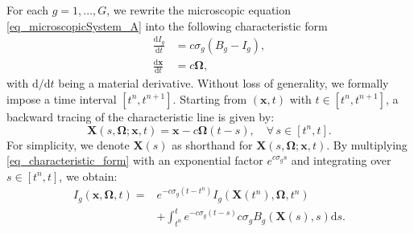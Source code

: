 \documentclass[preprint,12pt]{elsarticle}
\theoremstyle{definition}
\theoremstyle{plain}
\numberwithin{equation}{section}
\numberwithin{algorithm}{section}
\newcounter{eq_count}
\newcounter{subeq_count}
\newcounter{tab_count}
\newcommand{\vOmega}{\mathbf{\Omega}}
\newcommand{\vx}{\mathbf{x}}
\newcommand{\mfx}{{\mathbf{X}}}
\newcommand{\dd}{{\text{d}}}
\begin{document}





For each $g=1,\ldots,G$, we rewrite the microscopic equation \eqref{eq_microscopicSystem_A} into the following characteristic form
    \begin{subequations}
        \begin{align}\label{eq_characteristic_form}
            \frac{\dd{I_g}}{\dd{t}} &= c \sigma_g ( B_g - I_g),
            \\
            \frac{\dd{\vx}}{\dd{t}} &= c \vOmega,
        \end{align}
    \end{subequations}
with $\dd{} / \dd{t} $ being a material derivative.  
Without loss of generality, we formally impose a time interval $[t^n,t^{n+1}]$.
 Starting from $(\vx,t)$ with $t \in [t^n,t^{n+1}]$, a backward tracing of the characteristic line is given by:
    \begin{equation}\label{eq_def_characteristic_line}
        \mfx(s,\vOmega;\vx,t)=\vx-c \vOmega (t-s), \quad \forall \, s \in [t^n,t].
    \end{equation}
For simplicity, we denote $\mfx(s)$ as shorthand for $\mfx(s,\vOmega;\vx,t)$.  By multiplying \eqref{eq_characteristic_form} with an exponential factor $e^{c\sigma_g s  }$ and integrating over $s \in [t^n,t]$, we obtain:
    \begin{equation}
		\begin{aligned}\label{eq_formal_solution}
			I_g( \vx, \vOmega,t)= & e^{- c  \sigma_g (t - t^n)} I_{g}( \mfx(t^n), \vOmega, t^n ) 
            \\ 
			& +\int_{t^n}^{t} e^{- c  \sigma_g (t - s )} c\sigma_{g} B_g ( \mfx(s),  s )\dd{s}.
		\end{aligned}
    \end{equation}
\end{document}
